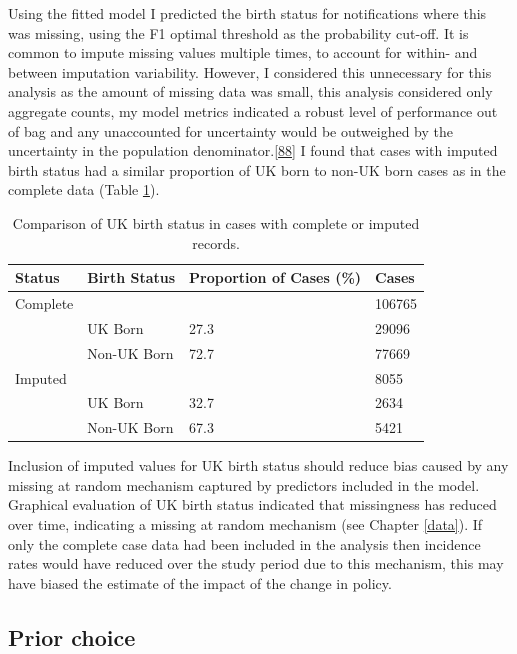 \documentclass[11pt,twoside]{bristolthesis}
\begin{document}
  Using the fitted model I predicted the birth status for notifications where this was missing, using the F1 optimal threshold as the probability cut-off. It is common to impute missing values multiple times, to account for within- and between imputation variability. However, I considered this unnecessary for this analysis as the amount of missing data was small, this analysis considered only aggregate counts, my model metrics indicated a robust level of performance out of bag and any unaccounted for uncertainty would be outweighed by the uncertainty in the population denominator.{[}\protect\hyperlink{ref-Thomas2018}{88}{]} I found that cases with imputed birth status had a similar proportion of UK born to non-UK born cases as in the complete data (Table \ref{tab:07-imp-com}).
  \begin{table}[H]
  
  \caption{\label{tab:07-imp-com}Comparison of UK birth status in cases with complete or imputed records.}
  \centering
  \begin{tabular}{llll}
  \toprule
  Status & Birth Status & Proportion of Cases (\%) & Cases\\
  \midrule
  Complete &  &  & 106765\\
   & UK Born & 27.3 & 29096\\
   & Non-UK Born & 72.7 & 77669\\
  Imputed &  &  & 8055\\
   & UK Born & 32.7 & 2634\\
  \addlinespace
   & Non-UK Born & 67.3 & 5421\\
  \bottomrule
  \end{tabular}
  \end{table}
  Inclusion of imputed values for UK birth status should reduce bias caused by any missing at random mechanism captured by predictors included in the model. Graphical evaluation of UK birth status indicated that missingness has reduced over time, indicating a missing at random mechanism (see Chapter \ref{data}). If only the complete case data had been included in the analysis then incidence rates would have reduced over the study period due to this mechanism, this may have biased the estimate of the impact of the change in policy.
  
  \hypertarget{prior-choice}{%
  \subsection{Prior choice}\label{prior-choice}}
  
\end{document}
